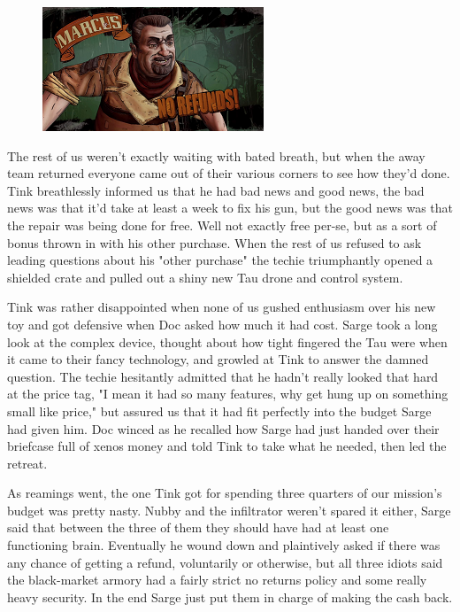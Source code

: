 \begin{figure}
	\begin{center}
		\includegraphics[width=\figwidth]{pics/10/39.png}
	\end{center}
\end{figure}
The rest of us weren't exactly waiting with bated breath, but when the away team returned everyone came out of their various corners to see how they'd done. 
Tink breathlessly informed us that he had bad news and good news, the bad news was that it'd take at least a week to fix his gun, but the good news was that the repair was being done for free. 
Well not exactly free per-se, but as a sort of bonus thrown in with his other purchase. 
When the rest of us refused to ask leading questions about his "other purchase" the techie triumphantly opened a shielded crate and pulled out a shiny new Tau drone and control system. 


Tink was rather disappointed when none of us gushed enthusiasm over his new toy and got defensive when Doc asked how much it had cost. 
Sarge took a long look at the complex device, thought about how tight fingered the Tau were when it came to their fancy technology, and growled at Tink to answer the damned question. 
The techie hesitantly admitted that he hadn't really looked that hard at the price tag, "I mean it had so many features, why get hung up on something small like price," but assured us that it had fit perfectly into the budget Sarge had given him. 
Doc winced as he recalled how Sarge had just handed over their briefcase full of xenos money and told Tink to take what he needed, then led the retreat.

As reamings went, the one Tink got for spending three quarters of our mission's budget was pretty nasty. 
Nubby and the infiltrator weren't spared it either, Sarge said that between the three of them they should have had at least one functioning brain. 
Eventually he wound down and plaintively asked if there was any chance of getting a refund, voluntarily or otherwise, but all three idiots said the black-market armory had a fairly strict no returns policy and some really heavy security. 
In the end Sarge just put them in charge of making the cash back.

